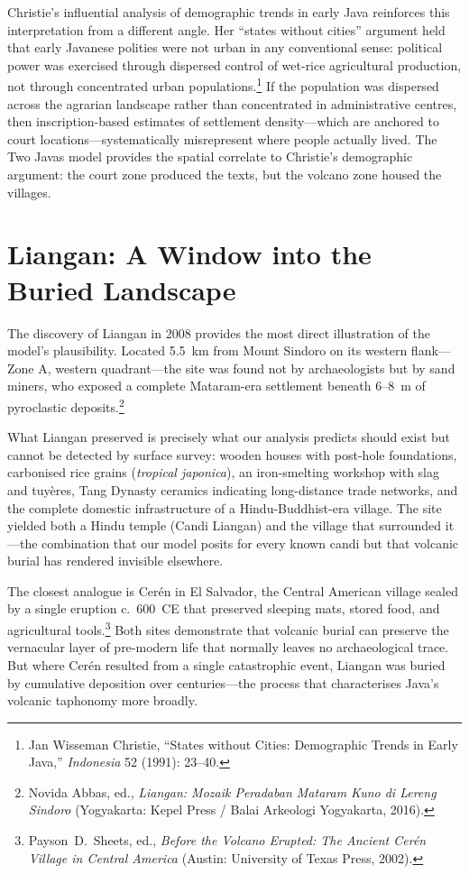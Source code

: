 \documentclass[12pt,a4paper]{article}
\begin{document}
Christie's influential analysis of demographic trends in early Java reinforces this interpretation from a different angle.
Her ``states without cities'' argument held that early Javanese polities were not urban in any conventional sense: political power was exercised through dispersed control of wet-rice agricultural production, not through concentrated urban populations.\footnote{Jan Wisseman Christie, ``States without Cities: Demographic Trends in Early Java,'' \emph{Indonesia} 52 (1991): 23--40.}
If the population was dispersed across the agrarian landscape rather than concentrated in administrative centres, then inscription-based estimates of settlement density---which are anchored to court locations---systematically misrepresent where people actually lived.
The Two Javas model provides the spatial correlate to Christie's demographic argument: the court zone produced the texts, but the volcano zone housed the villages.


\section{Liangan: A Window into the Buried Landscape}

The discovery of Liangan in 2008 provides the most direct illustration of the model's plausibility.
Located 5.5~km from Mount Sindoro on its western flank---Zone A, western quadrant---the site was found not by archaeologists but by sand miners, who exposed a complete Mataram-era settlement beneath 6--8~m of pyroclastic deposits.\footnote{Novida Abbas, ed., \emph{Liangan: Mozaik Peradaban Mataram Kuno di Lereng Sindoro} (Yogyakarta: Kepel Press / Balai Arkeologi Yogyakarta, 2016).}

What Liangan preserved is precisely what our analysis predicts should exist but cannot be detected by surface survey: wooden houses with post-hole foundations, carbonised rice grains (\emph{tropical japonica}), an iron-smelting workshop with slag and tuyères, Tang Dynasty ceramics indicating long-distance trade networks, and the complete domestic infrastructure of a Hindu-Buddhist-era village.
The site yielded both a Hindu temple (Candi Liangan) and the village that surrounded it---the combination that our model posits for every known candi but that volcanic burial has rendered invisible elsewhere.

The closest analogue is Cerén in El Salvador, the Central American village sealed by a single eruption c.~600~CE that preserved sleeping mats, stored food, and agricultural tools.\footnote{Payson~D.\ Sheets, ed., \emph{Before the Volcano Erupted: The Ancient Cer\'{e}n Village in Central America} (Austin: University of Texas Press, 2002).}
Both sites demonstrate that volcanic burial can preserve the vernacular layer of pre-modern life that normally leaves no archaeological trace.
But where Cerén resulted from a single catastrophic event, Liangan was buried by cumulative deposition over centuries---the process that characterises Java's volcanic taphonomy more broadly.
\end{document}
